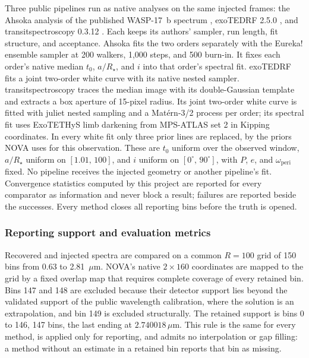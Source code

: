 Three public pipelines run as native analyses on the same injected
frames: the Ahsoka analysis of the published WASP-17~b spectrum
\citep{LouieEtAl2025}, exoTEDRF 2.5.0 \citep{Radica2024}, and
transitspectroscopy 0.3.12 \citep{Espinoza2022TransitSpectroscopy}. Each
keeps its authors' sampler, run length, fit structure, and acceptance.
Ahsoka fits the two orders separately with the Eureka! ensemble sampler
\citep{ForemanMackeyEtAl2013} at 200 walkers, 1{,}000 steps, and 500
burn-in. It fixes each order's native median $t_0$, $a/R_\star$, and $i$
into that order's spectral fit. exoTEDRF fits a joint two-order white
curve with its native nested sampler.
transitspectroscopy traces the median image with its double-Gaussian
template and extracts a box aperture of 15-pixel radius. Its joint
two-order white curve is fitted with juliet \citep{EspinozaEtAl2019}
nested sampling and a Mat\'ern-3/2 process per
order; its spectral fit uses ExoTETHyS limb darkening from MPS-ATLAS set
2 in Kipping coordinates. In every white fit only three prior lines are
replaced, by the priors NOVA uses for this observation. These are $t_0$
uniform over the observed window, $a/R_\star$ uniform on $[1.01,\,100]$,
and $i$ uniform on $[0^\circ,\,90^\circ]$, with $P$, $e$, and
$\omega_{\mathrm{peri}}$ fixed. No pipeline receives the injected
geometry or another pipeline's fit. Convergence statistics computed by
this project are reported for every comparator as information and never
block a result; failures are reported beside the successes. Every
method closes all reporting bins before the truth is opened.

\subsubsection{Reporting support and evaluation metrics}


Recovered and injected spectra are compared on a common $R=100$ grid of
150 bins from 0.63 to 2.81~$\mu\mathrm{m}$. NOVA's native $2\times160$
coordinates are mapped to the grid by a fixed overlap map that requires
complete coverage of every retained bin. Bins 147 and 148 are excluded
because their detector support lies beyond the validated support of the
public wavelength calibration, where the solution is an extrapolation,
and bin 149 is excluded structurally. The retained support is bins 0 to
146, 147 bins, the last ending at $2.740018\,\mu\mathrm{m}$. This rule is
the same for every method, is applied only for reporting, and admits no
interpolation or gap filling: a method without an estimate in a retained
bin reports that bin as missing.

